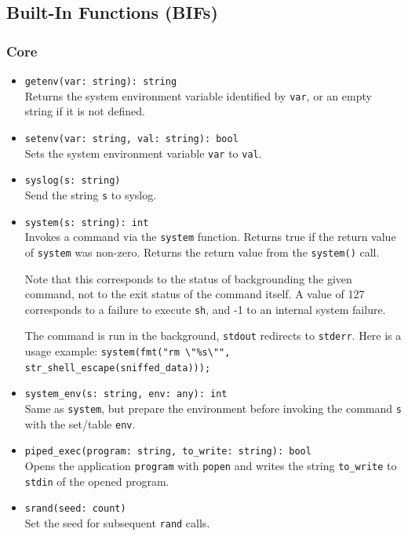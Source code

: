 \documentclass[10pt,landscape]{article}
\newcommand{\verbose}[1]{#1}
\newcommand{\verbose}[1]{}
\begin{document}
\begin{multicols*}{2}
\subsection*{Built-In Functions (BIFs)}
\linespread{0.9}

\subsubsection*{Core}

\begin{itemize}
\verbose{
  \item \verb|getenv(var: string): string|\\
    Returns the system environment variable identified by \verb|var|, or an
    empty string if it is not defined.
  \item \verb|setenv(var: string, val: string): bool|\\
    Sets the system environment variable \verb|var| to \verb|val|.
}
  \item \verb|syslog(s: string)|\\
    Send the string \verb|s| to syslog.
  \item \verb|system(s: string): int|\\
    Invokes a command via the \texttt{system} function.
    Returns true if the return value of \texttt{system} was non-zero.
    Returns the return value from the \texttt{system()} call.
\verbose{
    Note that this corresponds to the status of backgrounding the given
    command, not to the exit status of the command itself. A value of 127
    corresponds to a failure to execute \verb|sh|, and -1 to an internal system
    failure. 
}
    The command is run in the background, \verb|stdout| redirects to
    \verb|stderr|. Here is a usage example:
    \verb|system(fmt("rm \"%s\"", str_shell_escape(sniffed_data)));|
\verbose{
  \item \verb|system_env(s: string, env: any): int|\\
    Same as \verb|system|, but prepare the environment before invoking the
    command \verb|s| with the set/table \verb|env|.
}
  \item \verb|piped_exec(program: string, to_write: string): bool|\\
    Opens the application \verb|program| with \verb|popen| and writes the
    string \verb|to_write| to \texttt{stdin} of the opened program. 
  \item \verb|srand(seed: count)|\\
    Set the seed for subsequent \verb|rand| calls.

\end{itemize}
\end{multicols*}
\end{document}
